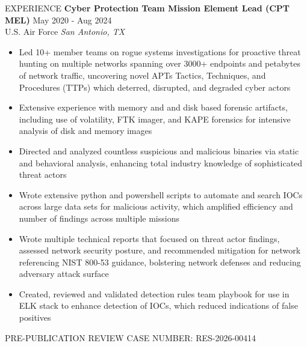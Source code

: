 \documentclass{resume} %
\begin{document}
\begin{rSection}{EXPERIENCE}
\textbf{Cyber Protection Team Mission Element Lead (CPT MEL)} \hfill May 2020 - Aug 2024\\ U.S. Air Force \hfill \textit{San Antonio, TX}
 \begin{itemize}
    \itemsep -3pt {} 
     \item Led 10+ member teams on rogue systems investigations for proactive threat hunting on multiple networks spanning over 3000+ endpoints and petabytes of network traffic, uncovering novel APTs Tactics, Techniques, and Procedures (TTPs) which deterred, disrupted, and degraded cyber actors
    \item Extensive experience with memory and and disk based forensic artifacts, including use of volatility, FTK imager, and KAPE forensics for intensive analysis of disk and memory images
    \item Directed and analyzed countless suspicious and malicious binaries via static and behavioral analysis, enhancing total industry knowledge of sophisticated threat actors
    \item Wrote extensive python and powershell scripts to automate and search IOCs across large data sets for malicious activity, which amplified efficiency and number of findings across multiple missions
    \item Wrote multiple technical reports that focused on threat actor findings, assessed network security posture, and recommended mitigation for network referencing NIST 800-53 guidance, bolstering network defenses and reducing adversary attack surface
    \item Created, reviewed and validated detection rules team playbook for use in ELK stack to enhance detection of IOCs, which reduced indications of false positives 
 \end{itemize}
\end{rSection} 


\vspace{1em}
\begin{center}
PRE-PUBLICATION REVIEW CASE NUMBER: RES-2026-00414
\end{center}
\end{document}
